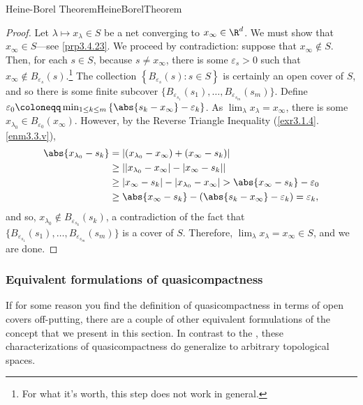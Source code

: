 \begin{thm}{Heine-Borel Theorem}{HeineBorelTheorem}
\begin{proof}
Let $\lambda \mapsto x_\lambda \in S$ be a net converging to $x_\infty \in \R ^d$.  We must show that $x_\infty \in S$---see \cref{prp3.4.23}.  We proceed by contradiction:  suppose that $x_\infty \notin S$.  Then, for each $s\in S$, because $s\neq x_\infty$, there is some $\varepsilon _s>0$ such that $x_\infty \notin B_{\varepsilon _s}(s)$.\footnote{For what it's worth, this step does not work in general.}  The collection $\left\{ B_{\varepsilon _s}(s):s\in S\right\}$ is certainly an open cover of $S$, and so there is some finite subcover $\{ B_{\varepsilon _{s_1}}(s_1),\ldots ,B_{\varepsilon _{s_m}}(s_m)\}$.  Define $\varepsilon _0\coloneqq \min _{1\leq k\leq m}\left\{ \abs{s_k-x_\infty}-\varepsilon _k\right\}$.  As $\lim _{\lambda}x_{\lambda}=x_{\infty}$, there is some $x_{\lambda _0}\in B_{\varepsilon _0}(x_\infty)$.  However, by the Reverse Triangle Inequality (\cref{exr3.1.4}.\cref{enm3.3.v}),
\begin{equation}
\begin{split}
\abs{x_{\lambda _0}-s_k} & =\left| (x_{\lambda _0}-x_\infty )+(x_\infty -s_k)\right| \\
& \geq \left| \left| x_{\lambda _0}-x_\infty \right| -\left| x_\infty -s_k\right| \right| \\
& \geq \left| x_\infty -s_k\right| -\left| x_{\lambda _0}-x_\infty \right| >\abs{x_{\infty}-s_k}-\varepsilon _0 \\
& \geq \abs{x_{\infty}-s_k}-\left( \abs{s_k-x_{\infty}}-\varepsilon _k\right) =\varepsilon _k,
\end{split}
\end{equation}
and so, $x_{\lambda _0}\notin B_{\varepsilon _{s_k}}(s_k)$, a contradiction of the fact that $\{ B_{\varepsilon _{s_1}}(s_1),\ldots ,B_{\varepsilon _{s_m}}(s_m)\}$ is a cover of $S$.  Therefore, $\lim _\lambda x_\lambda =x_\infty \in S$, and we are done.
\end{proof}
\end{thm}

\subsubsection{Equivalent formulations of quasicompactness}

If for some reason you find the definition of quasicompactness in terms of open covers off-putting, there are a couple of other equivalent formulations of the concept that we present in this section.  In contrast to the , these characterizations of quasicompactness do generalize to arbitrary topological spaces.


